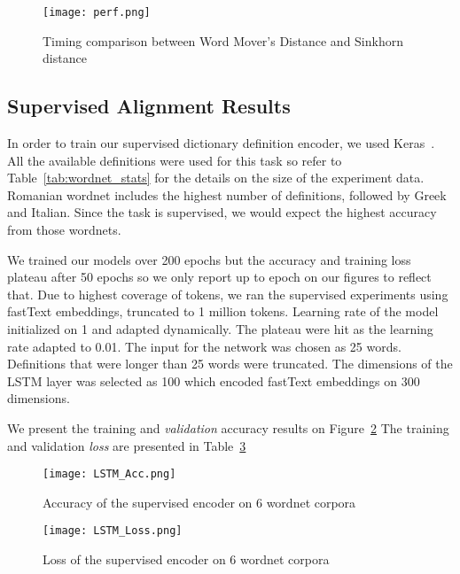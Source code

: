 \begin{figure}[htpb]
    \centering
    \texttt{[image: perf.png]}
    \caption{Timing comparison between Word Mover's Distance and Sinkhorn distance}%
    \label{fig:perf}
\end{figure}

\subsection{Supervised Alignment Results}%
\label{sec:supervised_encoding_results}

In order to train our supervised dictionary definition encoder, we used Keras~\cite{chollet_keras_2015}.
All the available definitions were used for this task so refer to Table~\ref{tab:wordnet_stats} for the details on the size of the experiment data.
Romanian wordnet includes the highest number of definitions, followed by Greek and Italian.
Since the task is supervised, we would expect the highest accuracy from those wordnets.

We trained our models over 200 epochs but the accuracy and training loss plateau after 50 epochs so we only report up to  epoch on our figures to reflect that.
Due to highest coverage of tokens, we ran the supervised experiments using fastText embeddings, truncated to 1 million tokens.
Learning rate of the model initialized on 1 and adapted dynamically.
The plateau were hit as the learning rate adapted to 0.01.
The input for the network was chosen as 25 words.
Definitions that were longer than 25 words were truncated.
The dimensions of the LSTM layer was selected as 100 which encoded fastText embeddings on 300 dimensions.

We present the training and \emph{validation} accuracy results on Figure~\ref{fig:LSTM_Acc}
The training and validation \emph{loss} are presented in Table~\ref{fig:LSTM_loss}

\begin{figure}[htpb]
    \centering
    \texttt{[image: LSTM\_Acc.png]}
    \caption{Accuracy of the supervised encoder on 6 wordnet corpora}%
    \label{fig:LSTM_Acc}
\end{figure}


\begin{figure}[htpb]
    \centering
    \texttt{[image: LSTM\_Loss.png]}
    \caption{Loss of the supervised encoder on 6 wordnet corpora}%
    \label{fig:LSTM_loss}
\end{figure}

